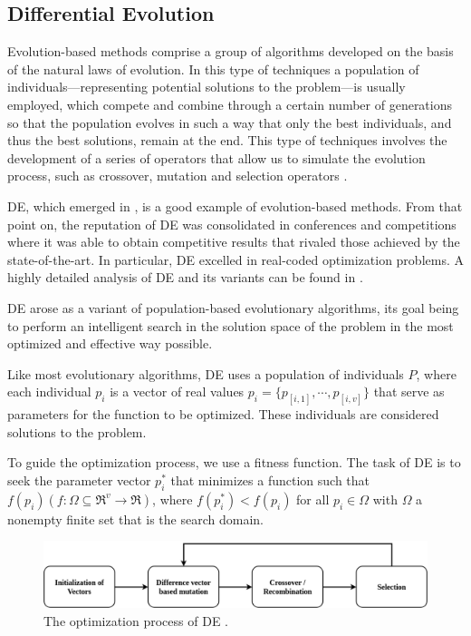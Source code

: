 \documentclass[review]{elsarticle}
\begin{document}
\subsection{Differential Evolution} \label{sec:BackDE}

Evolution-based methods comprise a group of algorithms developed on the basis of the natural laws of evolution. In this type of techniques a population of individuals---representing potential solutions to the problem---is usually employed, which compete and combine through a certain number of generations so that the population evolves in such a way that only the best individuals, and thus the best solutions, remain at the end. This type of techniques involves the development of a series of operators that allow us to simulate the evolution process, such as crossover, mutation and selection operators \cite{fausto2019ants}. 

DE, which emerged in \cite{storn1997differential}, is a good example of evolution-based methods. From that point on, the reputation of DE was consolidated in conferences and competitions where it was able to obtain competitive results that rivaled those achieved by the state-of-the-art. In particular, DE excelled in real-coded optimization problems. A highly detailed analysis of DE and its variants can be found in \cite{das2011differential}.

DE arose as a variant of population-based evolutionary algorithms, its goal being to perform an intelligent search in the solution space of the problem in the most optimized and effective way possible.

Like most evolutionary algorithms, DE uses a population of individuals $P$, where each individual $p_i$ is a vector of real values $p_i = \{p_{[i,1]},\cdots,p_{[i,v]}\}$ that serve as parameters for the function to be optimized. These individuals are considered solutions to the problem.

To guide the optimization process, we use a fitness function. The task of DE is to seek the parameter vector $p_i^*$ that minimizes a function such that $f(p_i)(f: \Omega \subseteq \mathfrak{R}^{v} \rightarrow \mathfrak{R})$, where $f(p_i^*) < f(p_i)$ for all $p_i \in \Omega$ with $\Omega$ a nonempty finite set that is the search domain.

\begin{figure}[!h]
	\centering
	\includegraphics[scale=0.3]{Figures/DEop.png}
	\caption{The optimization process of DE \cite{das2011differential}.}\label{img:DE}
\end{figure}
\end{document}
